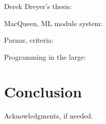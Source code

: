 \documentclass{sigplanconf}
\begin{document}
Derek Dreyer's thesis:
~\cite{dreyer2005understanding}

MacQueen, ML module system:
~\cite{macqueen1984modules}

Parnas, criteria:
~\cite{parnas1972criteria}

Programming in the large:
~\cite{deremer1976programming}

\section{Conclusion}


\acks

Acknowledgments, if needed.




\end{document}
